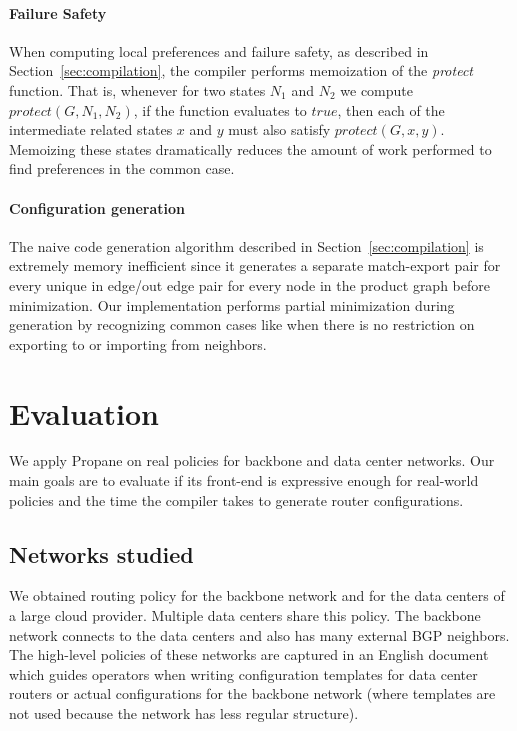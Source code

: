 \documentclass[10pt]{sigalternate052015}
\newcommand{\sysname}{{\small \sf Propane}\xspace}
\newcommand{\para}[1]{\paragraph*{\textbf{#1}}}
\begin{document}
\para{Failure Safety}

When computing local preferences and failure safety, as described in Section~\ref{sec:compilation}, the compiler performs memoization of the \textit{protect} function. That is, whenever for two states $N_1$ and $N_2$ we compute $protect(G, N_1, N_2)$, if the function evaluates to $true$, then each of the intermediate related states $x$ and $y$ must also satisfy $protect(G, x, y)$. Memoizing these states dramatically reduces the amount of work performed to find preferences in the common case.

\para{Configuration generation}

The naive code generation algorithm described in Section~\ref{sec:compilation} is extremely memory inefficient since it generates a separate match-export pair for every unique in edge/out edge pair for every node in the product graph before minimization. Our implementation performs partial minimization during generation by recognizing common cases like when there is no restriction on exporting to or importing from neighbors.




%
%
%
%


\section{Evaluation}
\label{sec:evaluation}


We apply \sysname on real policies for backbone and data center networks. Our main goals are to evaluate if its front-end is expressive enough for real-world policies and the time the compiler takes to generate router configurations.

\subsection{Networks studied}

We obtained routing policy for the backbone network and for the data centers of a large cloud provider. Multiple data centers share this policy. The backbone network connects to the data centers and also has many external BGP neighbors. The high-level policies of these networks are captured in an English document which guides operators when writing configuration templates for data center routers or actual configurations for the backbone network (where templates are not used because the network has less regular structure).
\end{document}
